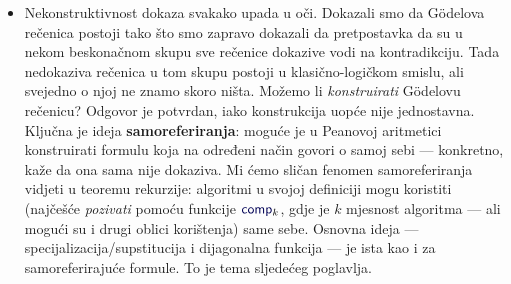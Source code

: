 \begin{itemize}
    \item Nekonstruktivnost dokaza svakako upada u oči. Dokazali smo da Gödelova rečenica postoji tako što smo zapravo dokazali da pretpostavka da su u nekom beskonačnom skupu sve rečenice dokazive vodi na kontradikciju. Tada nedokaziva rečenica u tom skupu postoji u klasično-logičkom smislu, ali svejedno o njoj ne znamo skoro ništa. Možemo li \emph{konstruirati} Gödelovu rečenicu? Odgovor je potvrdan, iako konstrukcija uopće nije jednostavna. Ključna je ideja \textbf{samoreferiranja}: moguće je u Peanovoj aritmetici konstruirati formulu koja na određeni način govori o samoj sebi --- konkretno, kaže da ona sama nije dokaziva. Mi ćemo sličan fenomen samoreferiranja vidjeti u teoremu rekurzije: algoritmi u svojoj definiciji mogu koristiti (najčešće \emph{pozivati} pomoću funkcije $\f{comp}_k$, gdje je $k$ mjesnost algoritma --- ali mogući su i drugi oblici korištenja) same sebe. Osnovna ideja --- specijalizacija\slash supstitucija i dijagonalna funkcija --- je ista kao i za samoreferirajuće formule. To je tema sljedećeg poglavlja.
\end{itemize}
